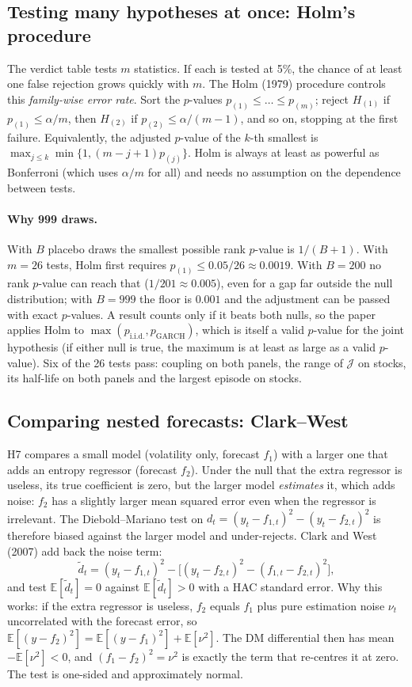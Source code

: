 \documentclass[11pt]{article}
\theoremstyle{plain}
\theoremstyle{definition}
\theoremstyle{remark}
\newcommand{\E}{\mathbb{E}}
\begin{document}
\subsection{Testing many hypotheses at once: Holm's procedure}

The verdict table tests $m$ statistics. If each is tested at 5\%, the chance
of at least one false rejection grows quickly with $m$. The Holm (1979)
procedure controls this \emph{family-wise error rate}. Sort the $p$-values
$p_{(1)}\le\dots\le p_{(m)}$; reject $H_{(1)}$ if $p_{(1)}\le\alpha/m$, then
$H_{(2)}$ if $p_{(2)}\le\alpha/(m-1)$, and so on, stopping at the first
failure. Equivalently, the adjusted $p$-value of the $k$-th smallest is
$\max_{j\le k}\min\{1,(m-j+1)p_{(j)}\}$. Holm is always at least as powerful
as Bonferroni (which uses $\alpha/m$ for all) and needs no assumption on the
dependence between tests.

\paragraph{Why 999 draws.} With $B$ placebo draws the smallest possible
rank $p$-value is $1/(B+1)$. With $m=26$ tests, Holm first requires
$p_{(1)}\le0.05/26\approx0.0019$. With $B=200$ no rank $p$-value can reach
that ($1/201\approx0.005$), even for a gap far outside the null distribution;
with $B=999$ the floor is $0.001$ and the adjustment can be passed with exact
$p$-values. A result counts only if it beats both nulls, so the paper applies
Holm to $\max(p_{\text{i.i.d.}},p_{\text{GARCH}})$, which is itself a valid
$p$-value for the joint hypothesis (if either null is true, the maximum is at
least as large as a valid $p$-value). Six of the 26 tests pass: coupling on
both panels, the range of $\mathcal J$ on stocks, its half-life on both panels
and the largest episode on stocks.

\subsection{Comparing nested forecasts: Clark--West}

H7 compares a small model (volatility only, forecast $f_1$) with a larger one
that adds an entropy regressor (forecast $f_2$). Under the null that the extra
regressor is useless, its true coefficient is zero, but the larger model
\emph{estimates} it, which adds noise: $f_2$ has a slightly larger mean squared
error even when the regressor is irrelevant. The Diebold--Mariano test on
$d_t=(y_t-f_{1,t})^2-(y_t-f_{2,t})^2$ is therefore biased against the larger
model and under-rejects. Clark and West (2007) add back the noise term:
\[
\tilde d_t=(y_t-f_{1,t})^2-\bigl[(y_t-f_{2,t})^2-(f_{1,t}-f_{2,t})^2\bigr],
\]
and test $\E[\tilde d_t]=0$ against $\E[\tilde d_t]>0$ with a HAC standard
error. Why this works: if the extra regressor is useless, $f_2$ equals $f_1$
plus pure estimation noise $\nu_t$ uncorrelated with the forecast error, so
$\E[(y-f_2)^2]=\E[(y-f_1)^2]+\E[\nu^2]$. The DM differential then has mean
$-\E[\nu^2]<0$, and $(f_1-f_2)^2=\nu^2$ is exactly the term that re-centres it
at zero. The test is one-sided and approximately normal.
\end{document}
